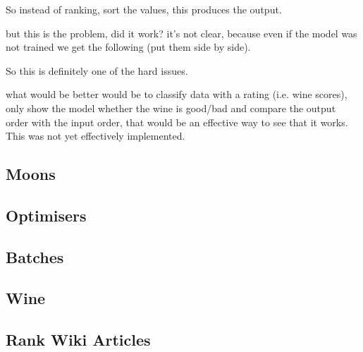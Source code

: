 \documentclass[a4paper,11pt,twoside]{article}
\begin{document}
So instead of ranking, sort the values, this produces the output.

but this is the problem, did it work? it's not clear, because even
if the model was not trained we get the following (put them side by side).

So this is definitely one of the hard issues.

what would be better would be to classify data with a rating
(i.e. wine scores), only show the model whether the wine is
good/bad and compare the output order with the input order, that
would be an effective way to see that it works. This was not yet
effectively implemented.
\subsection{Moons}
\label{sec:org5c71948}
\subsection{Optimisers}
\label{sec:org88eeaa4}
\subsection{Batches}
\label{sec:orge917b54}
\subsection{Wine}
\label{sec:org293131b}
\subsection{Rank Wiki Articles}
\label{sec:org21646bc}
\end{document}
